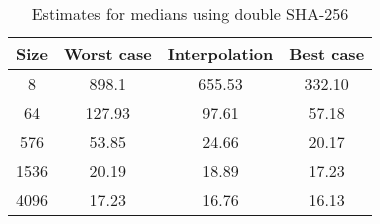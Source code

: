 \begin{table}
  \centering
  \caption{Estimates for medians using double SHA-256}
  \begin{tabular}{ | c | c | c | c |}
    \hline
    \textbf{Size} & \textbf{Worst case} & \textbf{Interpolation} & \textbf{Best case} \\ \hline
    8    & 898.1  & 655.53  & 332.10 \\ \hline
    64   & 127.93 & 97.61  & 57.18 \\ \hline
    576  & 53.85  & 24.66  & 20.17 \\ \hline
    1536 & 20.19  & 18.89  & 17.23 \\ \hline
    4096 & 17.23  & 16.76  & 16.13 \\ \hline
  \end{tabular}
  \label{tbl:supercop:sha256d}
\end{table}
